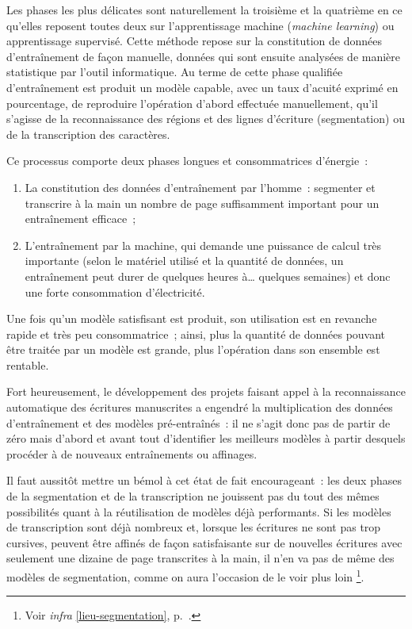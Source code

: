 \documentclass[a4paper,12pt,twoside]{book}
\begin{document}
			Les phases les plus délicates sont naturellement la troisième et la quatrième en ce qu'elles reposent toutes deux sur l'apprentissage machine (\textit{machine learning}) ou apprentissage supervisé. Cette méthode repose sur la constitution de données d'entraînement de façon manuelle, données qui sont ensuite analysées de manière statistique par l'outil informatique. Au terme de cette phase qualifiée d'entraînement est produit un modèle capable, avec un taux d'acuité exprimé en pourcentage, de reproduire l'opération d'abord effectuée manuellement, qu'il s'agisse de la reconnaissance des régions et des lignes d'écriture (\gls{segmentation}) ou de la transcription des caractères.
			
			Ce processus comporte deux phases longues et consommatrices d'énergie~:
			
			\begin{enumerate}
				\item La constitution des données d'entraînement par l'homme~: segmenter et transcrire à la main un nombre de page suffisamment important pour un entraînement efficace~;
				\item L'entraînement par la machine, qui demande une puissance de calcul très importante (selon le matériel utilisé et la quantité de données, un entraînement peut durer de quelques heures à… quelques semaines) et donc une forte consommation d'électricité.
			\end{enumerate}
			
			Une fois qu'un modèle satisfisant est produit, son utilisation est en revanche rapide et très peu consommatrice~; ainsi, plus la quantité de données pouvant être traitée par un modèle est grande, plus l'opération dans son ensemble est rentable.
			
			Fort heureusement, le développement des projets faisant appel à la reconnaissance automatique des écritures manuscrites a engendré la multiplication des données d'entraînement et des modèles pré-entraînés~: il ne s'agit donc pas de partir de zéro mais d'abord et avant tout d'identifier les meilleurs modèles à partir desquels procéder à de nouveaux entraînements ou affinages.
			
			Il faut aussitôt mettre un bémol à cet état de fait encourageant~: les deux phases de la \gls{segmentation} et de la transcription ne jouissent pas du tout des mêmes possibilités quant à la réutilisation de modèles déjà performants. Si les modèles de transcription sont déjà nombreux et, lorsque les écritures ne sont pas trop cursives, peuvent être affinés de façon satisfaisante sur de nouvelles écritures avec seulement une dizaine de page transcrites à la main, il n'en va pas de même des modèles de \gls{segmentation}, comme on aura l'occasion de le voir plus loin
			\footnote{Voir \textit{infra} \ref{lieu-segmentation}, p.~\pageref{lieu-segmentation}.}.
			
\end{document}

